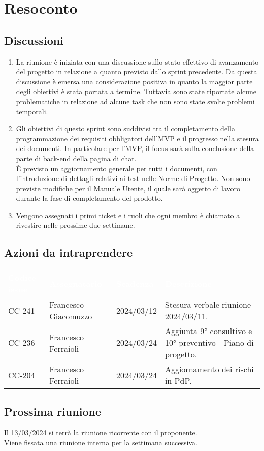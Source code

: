 \section{Resoconto} \label{sec:resoconto}
\subsection{Discussioni} \label{subsec:resdiscussione}
\begin{enumerate}
    \item La riunione è iniziata con una discussione sullo stato effettivo di avanzamento del progetto in relazione a quanto previsto dallo sprint precedente. Da questa discussione è emersa una considerazione positiva in quanto la maggior parte degli obiettivi è stata portata a termine. 
    Tuttavia sono state riportate alcune problematiche in relazione ad alcune task che non sono state svolte problemi temporali.

    \item Gli obiettivi di questo sprint sono suddivisi tra il completamento della programmazione dei requisiti obbligatori dell'MVP e il progresso nella stesura dei documenti. In particolare per l'MVP, il focus sarà sulla conclusione della parte di back-end della pagina di chat.\\
    È previsto un aggiornamento generale per tutti i documenti, con l'introduzione di dettagli relativi ai test nelle Norme di Progetto. Non sono previste modifiche per il Manuale Utente, il quale sarà oggetto di lavoro durante la fase di completamento del prodotto.
    \item Vengono assegnati i primi ticket e i ruoli che ogni membro è chiamato a rivestire nelle prossime due settimane.
\end{enumerate}

\subsection{Azioni da intraprendere}
{
    \setlength{\tabcolsep}{10pt}
            \renewcommand{\arraystretch}{1.5}
            \begin{xltabular}{\textwidth}{| l | l | l | X |}
                 \hline
                 \textbf{\textcolor{white}{Codice issue}} & \textbf{\textcolor{white}{Assegnatario}} & \textbf{\textcolor{white}{Scadenza}} & \textbf{\textcolor{white}{Descrizione}} \\
                 \hline
                 CC-241 & Francesco Giacomuzzo & 2024/03/12 & Stesura verbale riunione 2024/03/11.\\
                 \hline
                 CC-236 & Francesco Ferraioli & 2024/03/24 & Aggiunta 9° consultivo e 10° preventivo - Piano di progetto.\\
                 \hline
                 CC-204 & Francesco Ferraioli & 2024/03/24 & Aggiornamento dei rischi in PdP.\\
                 \hline
                 
            \end{xltabular}
}

\subsection{Prossima riunione} \label{subsec:riunione}
Il 13/03/2024 si terrà la riunione ricorrente con il proponente. \\ 
Viene fissata una riunione interna per la settimana successiva.